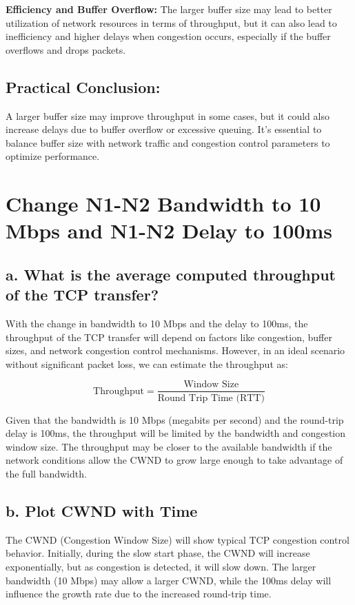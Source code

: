 \documentclass{article}
\begin{document}
\textbf{Efficiency and Buffer Overflow:} The larger buffer size may lead to better utilization of network resources in terms of throughput, but it can also lead to inefficiency and higher delays when congestion occurs, especially if the buffer overflows and drops packets.

\subsection*{Practical Conclusion:}

A larger buffer size may improve throughput in some cases, but it could also increase delays due to buffer overflow or excessive queuing. It's essential to balance buffer size with network traffic and congestion control parameters to optimize performance.


\section*{Change N1-N2 Bandwidth to 10 Mbps and N1-N2 Delay to 100ms}

\subsection*{a. What is the average computed throughput of the TCP transfer?}

With the change in bandwidth to 10 Mbps and the delay to 100ms, the throughput of the TCP transfer will depend on factors like congestion, buffer sizes, and network congestion control mechanisms. However, in an ideal scenario without significant packet loss, we can estimate the throughput as:

\[
\text{Throughput} = \frac{\text{Window Size}}{\text{Round Trip Time (RTT)}}
\]

Given that the bandwidth is 10 Mbps (megabits per second) and the round-trip delay is 100ms, the throughput will be limited by the bandwidth and congestion window size. The throughput may be closer to the available bandwidth if the network conditions allow the CWND to grow large enough to take advantage of the full bandwidth.

\subsection*{b. Plot CWND with Time}

The CWND (Congestion Window Size) will show typical TCP congestion control behavior. Initially, during the slow start phase, the CWND will increase exponentially, but as congestion is detected, it will slow down. The larger bandwidth (10 Mbps) may allow a larger CWND, while the 100ms delay will influence the growth rate due to the increased round-trip time.
\end{document}

